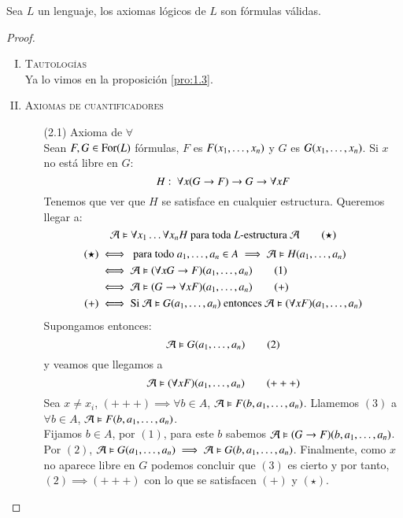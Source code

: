 \begin{lm}\label{lm:axval}
    Sea $L$ un lenguaje, los axiomas lógicos de $L$ son fórmulas válidas.
\end{lm}
\begin{proof}$ $
    \begin{enumerate}[(I)]
        \item \textsc{Tautologías}\\
        Ya lo vimos en la proposición \ref{pro:1.3}.
        \item \textsc{Axiomas de cuantificadores}
        \begin{itemize}
            \item[(2.1)] Axioma de $\forall$\\
                Sean $F, G \in \mathrm{For}(L)$ fórmulas, $F$ es $F({x}_{1}, \ldots, {x}_{n})$ y $G$ es $G({x}_{1}, \ldots, {x}_{n})$. Si $x$ no está libre en $G$:
                $$
                    H:\ \forall x (G \rightarrow F) \rightarrow G \rightarrow \forall x F
                $$
                Tenemos que ver que $H$ se satisface en cualquier estructura. Queremos llegar a:
                \begin{equation*}
                    \mathcal{A} \vDash \forall x_1 \ldots \forall x_n H \text{ para toda $L$-estructura } \mathcal{A} \tag{$\star$}
                \end{equation*}
                \begin{align*}
                    (\star) &\iff \text{ para todo } {a}_{1}, \ldots, {a}_{n} \in A \implies \mathcal{A} \vDash H({a}_{1}, \ldots, {a}_{n})\\
                            &\iff \mathcal{A} \vDash (\forall x G \rightarrow F) ({a}_{1}, \ldots, {a}_{n}) \tag{$1$} \\
                            &\iff \mathcal{A} \vDash (G \rightarrow \forall x F) ({a}_{1}, \ldots, {a}_{n}) \tag{$+$} \\
                    (+)     &\iff \text{Si } \mathcal{A} \vDash G({a}_{1}, \ldots, {a}_{n}) \text{ entonces } \mathcal{A} \vDash (\forall x F)({a}_{1}, \ldots, {a}_{n})
                \end{align*}
                Supongamos entonces:
                \begin{equation*}
                    \mathcal{A} \vDash G({a}_{1}, \ldots, {a}_{n}) \tag{$2$}
                \end{equation*}
                y veamos que llegamos a
                \begin{equation*}
                    \mathcal{A} \vDash (\forall x F)({a}_{1}, \ldots, {a}_{n}) \tag{$+++$}
                \end{equation*}
                Sea $x \neq x_i$, $(+++) \implies \forall b \in A$, $\mathcal{A} \vDash F(b, {a}_{1}, \ldots, {a}_{n})$. Llamemos $(3)$ a $\forall b \in A$, $\mathcal{A} \vDash F(b, {a}_{1}, \ldots, {a}_{n})$.\\
                Fijamos $b \in A$, por $(1)$, para este $b$ sabemos $\mathcal{A} \vDash (G \rightarrow F)(b, {a}_{1}, \ldots, {a}_{n})$.\\
                Por $(2)$, $\mathcal{A} \vDash G({a}_{1}, \ldots, {a}_{n}) \implies \mathcal{A} \vDash G(b, {a}_{1}, \ldots, {a}_{n})$. Finalmente, como $x$ no aparece libre en $G$ podemos concluir que $(3)$ es cierto y por tanto, $(2) \implies (+++)$ con lo que se satisfacen $(+)$ y $(\star)$.


\end{itemize}
\end{enumerate}
\end{proof}
